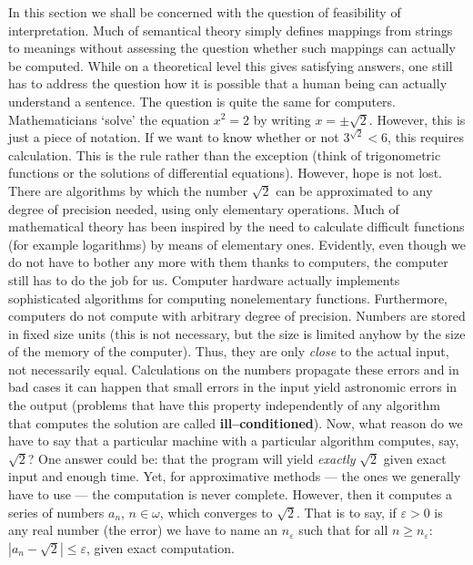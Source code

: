 In this section we shall be concerned with the question of
feasibility of interpretation. Much of semantical theory
simply defines mappings from strings to meanings without
assessing the question whether such mappings can actually be
computed. While on a theoretical level this gives satisfying
answers, one still has to address the question how it is
possible that a human being can actually understand a sentence.
The question is quite the same for computers. Mathematicians
`solve' the equation $x^{2} = 2$ by writing $x = \pm \sqrt{2}$.
However, this is just a piece of notation. If we want to know
whether or not $3^{\sqrt{2}} < 6$, this requires calculation.
This is the rule rather than the exception (think of trigonometric 
functions or the solutions of differential equations).
However, hope is not lost. There are algorithms by which the
number $\sqrt{2}$ can be approximated to any degree of precision
needed, using only elementary operations. Much of mathematical
theory has been inspired by the need to calculate difficult functions
(for example logarithms)  by means of elementary ones.
Evidently, even though we do not have to bother any more
with them thanks to computers, the computer still has to do
the job for us. Computer hardware actually implements sophisticated
algorithms for computing nonelementary functions. Furthermore,
computers do not compute with arbitrary degree of precision. Numbers
are stored in fixed size units (this is not necessary, but the
size is limited anyhow by the size of the memory of the
computer). Thus, they are only {\it close\/} to the actual input,
not necessarily equal. Calculations on the numbers propagate
these errors and in bad cases it can happen that small
errors in the input yield astronomic errors in the output
(problems that have this property independently of any algorithm
that computes the solution are called \textbf{ill--conditioned}).
Now, what reason do we have to say that a particular machine
with a particular algorithm computes, say, $\sqrt{2}$? One
answer could be: that the program will yield {\it exactly\/}
$\sqrt{2}$ given exact input and enough time. Yet, for approximative
methods --- the ones we generally have to use --- the computation 
is never complete. However, then it computes a series of numbers $a_n$,
$n \in \omega$, which converges to $\sqrt{2}$. That is to say,
if $\varepsilon > 0$ is any real number (the error) we have to name
an $n_{\varepsilon}$ such that for all $n \geq n_{\varepsilon}$:
$|a_n - \sqrt{2}| \leq \varepsilon$, given exact computation.
